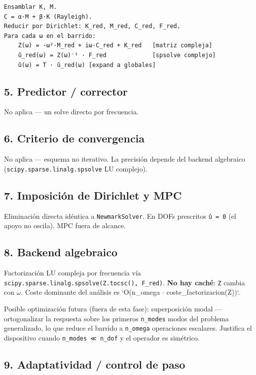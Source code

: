 \documentclass[11pt,letterpaper,oneside]{report}
\begin{document}
\begin{lstlisting}
Ensamblar K, M.
C = α·M + β·K (Rayleigh).
Reducir por Dirichlet: K_red, M_red, C_red, F_red.
Para cada ω en el barrido:
    Z(ω) = -ω²·M_red + iω·C_red + K_red   [matriz compleja]
    û_red(ω) = Z(ω)⁻¹ · F_red             [spsolve complejo]
    û(ω) = T · û_red(ω) [expand a globales]

\end{lstlisting}

\subsection{5. Predictor / corrector}

No aplica --- un solve directo por frecuencia.

\subsection{6. Criterio de convergencia}

No aplica --- esquema no iterativo. La precisión depende del backend
algebraico (\texttt{scipy.sparse.linalg.spsolve} LU complejo).

\subsection{7. Imposición de Dirichlet y MPC}

Eliminación directa idéntica a \texttt{NewmarkSolver}. En DOFs prescritos
\texttt{û = 0} (el apoyo no oscila). MPC fuera de alcance.

\subsection{8. Backend algebraico}

Factorización LU compleja por frecuencia vía
\texttt{scipy.sparse.linalg.spsolve(Z.tocsc(), F\_red)}. \textbf{No hay caché}: \texttt{Z}
cambia con \texttt{\ensuremath{\omega}}. Coste dominante del análisis es `O(n\_omega \ensuremath{\cdot}
coste\_factorizacion(Z))`.

Posible optimización futura (fuera de esta fase): superposición modal
--- ortogonalizar la respuesta sobre los primeros \texttt{n\_modes} modos del
problema generalizado, lo que reduce el barrido a \texttt{n\_omega} operaciones
escalares. Justifica el dispositivo cuando \texttt{n\_modes ≪ n\_dof} y el
operador es simétrico.

\subsection{9. Adaptatividad / control de paso}
\end{document}
